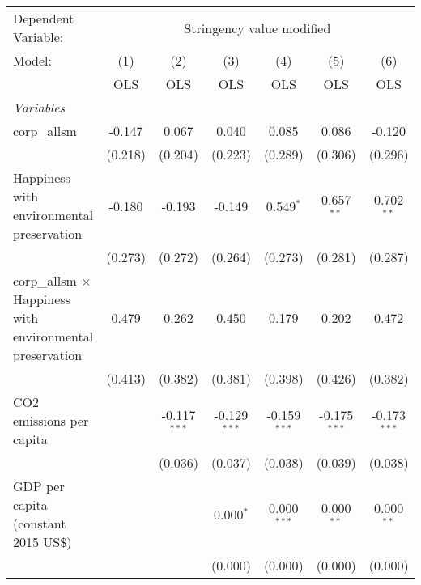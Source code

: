 
\begingroup
\centering
\begin{tabular}{lcccccc}
   \toprule
   Dependent Variable: & \multicolumn{6}{c}{Stringency value modified}\\
   Model:                                                           & (1)     & (2)            & (3)            & (4)            & (5)            & (6)\\  
                                                                    &  OLS    & OLS            & OLS            & OLS            & OLS            & OLS\\  
   \midrule
   \emph{Variables}\\
   corp\_allsm                                                      & -0.147  & 0.067          & 0.040          & 0.085          & 0.086          & -0.120\\   
                                                                    & (0.218) & (0.204)        & (0.223)        & (0.289)        & (0.306)        & (0.296)\\   
   Happiness with environmental preservation                        & -0.180  & -0.193         & -0.149         & 0.549$^{*}$    & 0.657$^{**}$   & 0.702$^{**}$\\   
                                                                    & (0.273) & (0.272)        & (0.264)        & (0.273)        & (0.281)        & (0.287)\\   
   corp\_allsm $\times$ Happiness with environmental preservation   & 0.479   & 0.262          & 0.450          & 0.179          & 0.202          & 0.472\\   
                                                                    & (0.413) & (0.382)        & (0.381)        & (0.398)        & (0.426)        & (0.382)\\   
   CO2 emissions per capita                                         &         & -0.117$^{***}$ & -0.129$^{***}$ & -0.159$^{***}$ & -0.175$^{***}$ & -0.173$^{***}$\\   
                                                                    &         & (0.036)        & (0.037)        & (0.038)        & (0.039)        & (0.038)\\   
   GDP per capita (constant 2015 US\$)                              &         &                & 0.000$^{*}$    & 0.000$^{***}$  & 0.000$^{**}$   & 0.000$^{**}$\\   
                                                                    &         &                & (0.000)        & (0.000)        & (0.000)        & (0.000)\\   

\end{tabular}
